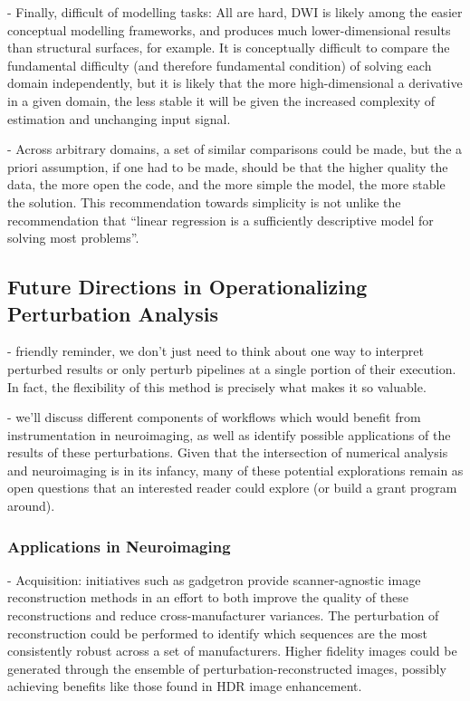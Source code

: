 - Finally, difficult of modelling tasks: All are hard, DWI is likely among the easier conceptual modelling
frameworks, and produces much lower-dimensional results than structural surfaces, for example. It is conceptually
difficult to compare the fundamental difficulty (and therefore fundamental condition) of solving each domain
independently, but it is likely that the more high-dimensional a derivative in a given domain, the less stable it
will be given the increased complexity of estimation and unchanging input signal.

- Across arbitrary domains, a set of similar comparisons could be made, but the a priori assumption, if one had to
be made, should be that the higher quality the data, the more open the code, and the more simple the model, the
more stable the solution. This recommendation towards simplicity is not unlike the recommendation that ``linear
regression is a sufficiently descriptive model for solving most problems''.

\subsection{Future Directions in Operationalizing Perturbation Analysis}
- friendly reminder, we don't just need to think about one way to interpret perturbed results or only perturb
pipelines at a single portion of their execution. In fact, the flexibility of this method is precisely what makes
it so valuable.

- we'll discuss different components of workflows which would benefit from instrumentation in neuroimaging, as well
as identify possible applications of the results of these perturbations. Given that the intersection of numerical
analysis and neuroimaging is in its infancy, many of these potential explorations remain as open questions that an
interested reader could explore (or build a grant program around).

\subsubsection{Applications in Neuroimaging}
- Acquisition: initiatives such as gadgetron provide scanner-agnostic image reconstruction methods in an effort to
both improve the quality of these reconstructions and reduce cross-manufacturer variances. The perturbation of
reconstruction could be performed to identify which sequences are the most consistently robust across a set of
manufacturers. Higher fidelity images could be generated through the ensemble of perturbation-reconstructed images,
possibly achieving benefits like those found in HDR image enhancement.

